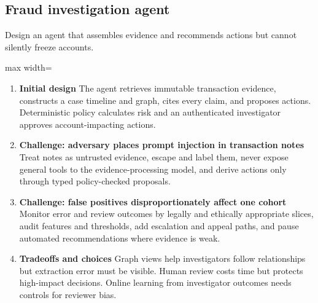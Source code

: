 \subsection{Fraud investigation agent}
Design an agent that assembles evidence and recommends actions but cannot silently freeze accounts.
\begin{center}\begin{adjustbox}{max width=\linewidth}\end{adjustbox}\end{center}
\begin{enumerate}
\item \textbf{Initial design} The agent retrieves immutable transaction evidence, constructs a case timeline and graph, cites every claim, and proposes actions. Deterministic policy calculates risk and an authenticated investigator approves account-impacting actions.
\item \textbf{Challenge: adversary places prompt injection in transaction notes} Treat notes as untrusted evidence, escape and label them, never expose general tools to the evidence-processing model, and derive actions only through typed policy-checked proposals.
\item \textbf{Challenge: false positives disproportionately affect one cohort} Monitor error and review outcomes by legally and ethically appropriate slices, audit features and thresholds, add escalation and appeal paths, and pause automated recommendations where evidence is weak.
\item \textbf{Tradeoffs and choices} Graph views help investigators follow relationships but extraction error must be visible. Human review costs time but protects high-impact decisions. Online learning from investigator outcomes needs controls for reviewer bias.
\end{enumerate}
